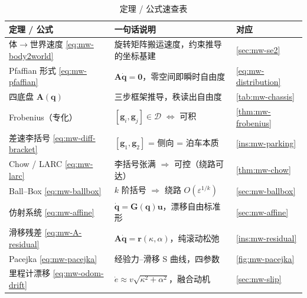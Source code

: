 \begin{table}[H]\centering\small
\caption{定理 / 公式速查表}
\begin{tabular}{lll}
\toprule
定理 / 公式 & 一句话说明 & 对应 \\
\midrule
体$\to$世界速度 \cref{eq:mw-body2world} & 旋转矩阵搬运速度，约束推导的坐标基建 & \cref{sec:mw-se2} \\
Pfaffian 形式 \cref{eq:mw-pfaffian} & $\mathbf{A}\dot{\mathbf{q}}=\mathbf{0}$，零空间即瞬时自由度 & \cref{eq:mw-distribution} \\
四底盘 $\mathbf{A}(\mathbf{q})$ & 三步框架推导，秩读出自由度 & \cref{tab:mw-chassis} \\
Frobenius（专化） & $[\mathbf{g}_i,\mathbf{g}_j]\in\mathcal{D}$ $\Leftrightarrow$ 可积 & \cref{thm:mw-frobenius} \\
差速李括号 \cref{eq:mw-diff-bracket} & $[\mathbf{g}_1,\mathbf{g}_2]$ = 侧向 = 泊车本质 & \cref{ins:mw-parking} \\
Chow / LARC \cref{eq:mw-larc} & 李括号张满 $\Rightarrow$ 可控（绕路可达） & \cref{thm:mw-chow} \\
Ball--Box \cref{eq:mw-ballbox} & $k$ 阶括号 $\Rightarrow$ 绕路 $O(\varepsilon^{1/k})$ & \cref{sec:mw-ballbox} \\
仿射系统 \cref{eq:mw-affine} & $\dot{\mathbf{q}}=\mathbf{G}(\mathbf{q})\mathbf{u}$，漂移自由标准形 & \cref{sec:mw-affine} \\
滑移残差 \cref{eq:mw-A-residual} & $\mathbf{A}\dot{\mathbf{q}}=\mathbf{r}(\kappa,\alpha)$，纯滚动松弛 & \cref{ins:mw-residual} \\
Pacejka \cref{eq:mw-pacejka} & 经验力--滑移 S 曲线，四参数 & \cref{fig:mw-pacejka} \\
里程计漂移 \cref{eq:mw-odom-drift} & $\dot e\approx v\sqrt{\kappa^2+\alpha^2}$，融合动机 & \cref{sec:mw-slip} \\
\bottomrule
\end{tabular}
\end{table}

